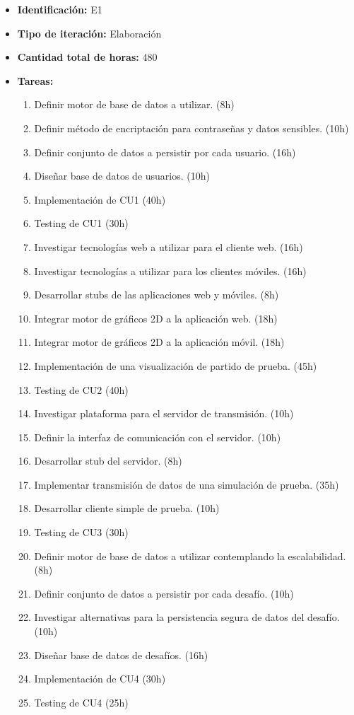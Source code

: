 \documentclass[a4paper, 10pt, twoside]{article}
\begin{document}
\begin{itemize}
  \item \textbf{Identificación:} E1
  \item \textbf{Tipo de iteración:} Elaboración
  \item \textbf{Cantidad total de horas:} 480
  \item \textbf{Tareas:}
\begin{enumerate}
  \item Definir motor de base de datos a utilizar. (8h)
  \item Definir método de encriptación para contraseñas y datos sensibles. (10h)
  \item Definir conjunto de datos a persistir por cada usuario. (16h)
  \item Diseñar base de datos de usuarios. (10h)
  \item Implementación de CU1 (40h)
  \item Testing de CU1 (30h)
  \item Investigar tecnologías web a utilizar para el cliente web. (16h)
  \item Investigar tecnologías a utilizar para los clientes móviles. (16h)
  \item Desarrollar stubs de las aplicaciones web y móviles. (8h)
  \item Integrar motor de gráficos 2D a la aplicación web. (18h)
  \item Integrar motor de gráficos 2D a la aplicación móvil. (18h)
  \item Implementación de una visualización de partido de prueba. (45h)
  \item Testing de CU2 (40h)
  \item Investigar plataforma para el servidor de transmisión. (10h)
  \item Definir la interfaz de comunicación con el servidor. (10h)
  \item Desarrollar stub del servidor. (8h)
  \item Implementar transmisión de datos de una simulación de prueba. (35h)
  \item Desarrollar cliente simple de prueba. (10h)
  \item Testing de CU3 (30h)
  \item Definir motor de base de datos a utilizar contemplando la escalabilidad. (8h)
  \item Definir conjunto de datos a persistir por cada desafío. (10h)
  \item Investigar alternativas para la persistencia segura de datos del desafío. (10h)
  \item Diseñar base de datos de desafíos. (16h)
  \item Implementación de CU4 (30h)
  \item Testing de CU4 (25h)
\end{enumerate}
\end{itemize}
\end{document}
